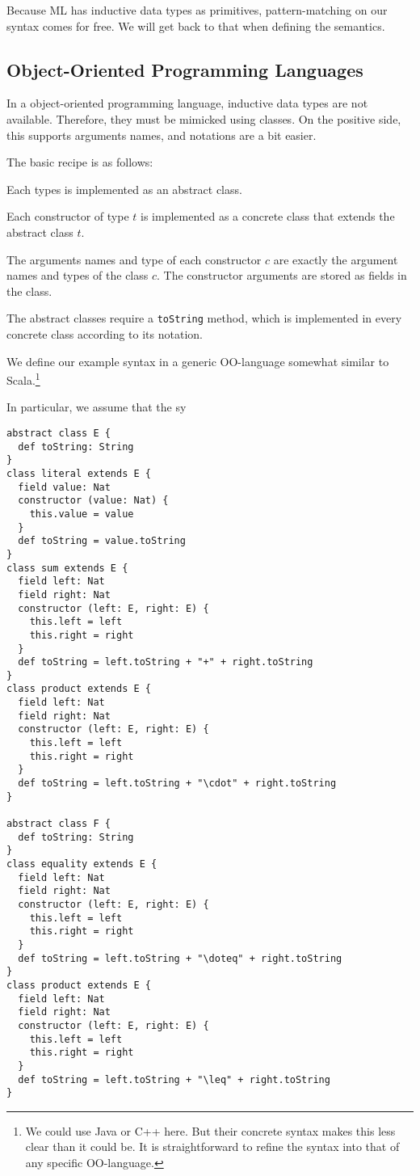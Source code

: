 Because ML has inductive data types as primitives, pattern-matching on our syntax comes for free.
We will get back to that when defining the semantics.

\subsection{Object-Oriented Programming Languages}

In a object-oriented programming language, inductive data types are not available.
Therefore, they must be mimicked using classes.
On the positive side, this supports arguments names, and notations are a bit easier.

The basic recipe is as follows:
\begin{compactitem}
\item Each types is implemented as an abstract class.
\item Each constructor of type $t$ is implemented as a concrete class that extends the abstract class $t$.
\item The arguments names and type of each constructor $c$ are exactly the argument names and types of the class $c$.
The constructor arguments are stored as fields in the class.
\item The abstract classes require a \texttt{toString} method, which is implemented in every concrete class according to its notation.
\end{compactitem}


\begin{example}
We define our example syntax in a generic OO-language somewhat similar to Scala.\footnote{We could use Java or C++ here. But their concrete syntax makes this less clear than it could be. It is straightforward to refine the syntax into that of any specific OO-language.}

In particular, we assume that the sy

\begin{lstlisting}
abstract class E {
  def toString: String
}
class literal extends E {
  field value: Nat
  constructor (value: Nat) {
    this.value = value
  }
  def toString = value.toString
}
class sum extends E {
  field left: Nat
  field right: Nat
  constructor (left: E, right: E) {
    this.left = left
    this.right = right
  }
  def toString = left.toString + "+" + right.toString
}
class product extends E {
  field left: Nat
  field right: Nat
  constructor (left: E, right: E) {
    this.left = left
    this.right = right
  }
  def toString = left.toString + "\cdot" + right.toString
}

abstract class F {
  def toString: String
}
class equality extends E {
  field left: Nat
  field right: Nat
  constructor (left: E, right: E) {
    this.left = left
    this.right = right
  }
  def toString = left.toString + "\doteq" + right.toString
}
class product extends E {
  field left: Nat
  field right: Nat
  constructor (left: E, right: E) {
    this.left = left
    this.right = right
  }
  def toString = left.toString + "\leq" + right.toString
}
\end{lstlisting}
\end{example}

